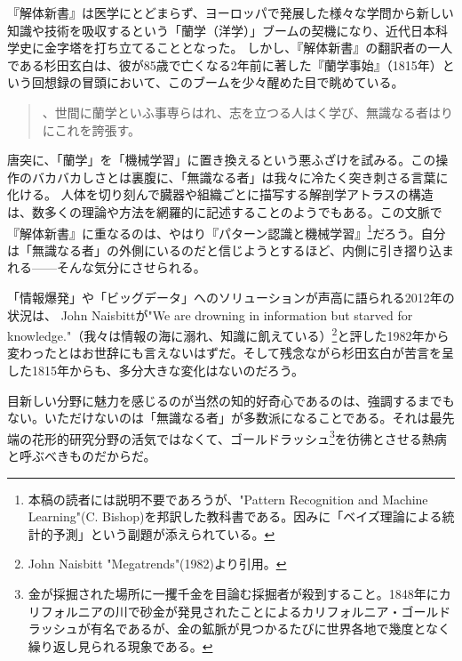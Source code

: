 『解体新書』は医学にとどまらず、ヨーロッパで発展した様々な学問から新しい知識や技術を吸収するという「蘭学（洋学）」ブームの契機になり、近代日本科学史に金字塔を打ち立てることとなった。
しかし、『解体新書』の翻訳者の一人である杉田玄白は、彼が85歳で亡くなる2年前に著した『蘭学事始』（1815年）という回想録の冒頭において、このブームを少々醒めた目で眺めている。

\begin{quote}
、世間に蘭学といふ事専らはれ、志を立つる人はく学び、無識なる者はりにこれを誇張す。
\end{quote}

唐突に、「蘭学」を「機械学習」に置き換えるという悪ふざけを試みる。この操作のバカバカしさとは裏腹に、「無識なる者」は我々に冷たく突き刺さる言葉に化ける。
人体を切り刻んで臓器や組織ごとに描写する解剖学アトラスの構造は、数多くの理論や方法を網羅的に記述することのようでもある。この文脈で『解体新書』に重なるのは、やはり『パターン認識と機械学習』\footnote{本稿の読者には説明不要であろうが、"Pattern Recognition and Machine Learning"(C. Bishop)を邦訳した教科書である。因みに「ベイズ理論による統計的予測」という副題が添えられている。}だろう。自分は「無識なる者」の外側にいるのだと信じようとするほど、内側に引き摺り込まれる------そんな気分にさせられる。


「情報爆発」や「ビッグデータ」へのソリューションが声高に語られる2012年の状況は、
John Naisbittが"We are drowning in information but starved for knowledge."（我々は情報の海に溺れ、知識に飢えている）\footnote{John Naisbitt "Megatrends"(1982)より引用。}と評した1982年から変わったとはお世辞にも言えないはずだ。そして残念ながら杉田玄白が苦言を呈した1815年からも、多分大きな変化はないのだろう。

目新しい分野に魅力を感じるのが当然の知的好奇心であるのは、強調するまでもない。いただけないのは「無識なる者」が多数派になることである。それは最先端の花形的研究分野の活気ではなくて、ゴールドラッシュ\footnote{金が採掘された場所に一攫千金を目論む採掘者が殺到すること。1848年にカリフォルニアの川で砂金が発見されたことによるカリフォルニア・ゴールドラッシュが有名であるが、金の鉱脈が見つかるたびに世界各地で幾度となく繰り返し見られる現象である。}を彷彿とさせる熱病と呼ぶべきものだからだ。

